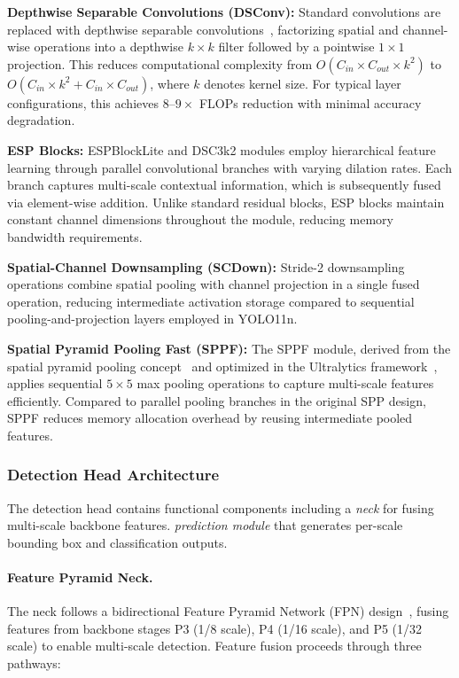 \textbf{Depthwise Separable Convolutions (DSConv):} Standard convolutions are replaced with depthwise separable convolutions~\cite{howard2017mobilenets}, factorizing spatial and channel-wise operations into a depthwise $k \times k$ filter followed by a pointwise $1 \times 1$ projection. This reduces computational complexity from $O(C_{in} \times C_{out} \times k^2)$ to $O(C_{in} \times k^2 + C_{in} \times C_{out})$, where $k$ denotes kernel size. For typical layer configurations, this achieves $8$--$9\times$ FLOPs reduction with minimal accuracy degradation.

\textbf{ESP Blocks:} ESPBlockLite and DSC3k2 modules employ hierarchical feature learning through parallel convolutional branches with varying dilation rates. Each branch captures multi-scale contextual information, which is subsequently fused via element-wise addition. Unlike standard residual blocks, ESP blocks maintain constant channel dimensions throughout the module, reducing memory bandwidth requirements.

\textbf{Spatial-Channel Downsampling (SCDown):} Stride-2 downsampling operations combine spatial pooling with channel projection in a single fused operation, reducing intermediate activation storage compared to sequential pooling-and-projection layers employed in YOLO11n.

\textbf{Spatial Pyramid Pooling Fast (SPPF):} The SPPF module, derived from the spatial pyramid pooling concept~\cite{he2015spatial} and optimized in the Ultralytics framework~\cite{yolo11_ultralytics}, applies sequential $5 \times 5$ max pooling operations to capture multi-scale features efficiently. Compared to parallel pooling branches in the original SPP design, SPPF reduces memory allocation overhead by reusing intermediate pooled features.

\subsubsection{Detection Head Architecture}
The detection head contains functional components including a \textit{neck} for fusing multi-scale backbone features. \textit{prediction module} that generates per-scale bounding box and classification outputs.

\paragraph{Feature Pyramid Neck.}
The neck follows a bidirectional Feature Pyramid Network (FPN) design~\cite{lin2017feature}, fusing features from backbone stages P3 (1/8 scale), P4 (1/16 scale), and P5 (1/32 scale) to enable multi-scale detection. Feature fusion proceeds through three pathways:

